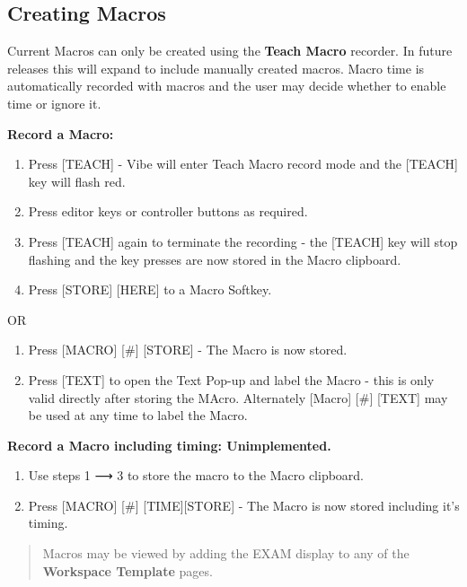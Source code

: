 \documentclass[
]{article}
\begin{document}
\hypertarget{creating-macros}{%
\subsection{Creating Macros}\label{creating-macros}}

Current Macros can only be created using the \textbf{Teach Macro} recorder. In future releases this will expand to include manually created macros. Macro time is automatically recorded with macros and the user may decide whether to enable time or ignore it.

\textbf{Record a Macro:}

\begin{enumerate}
\def\labelenumi{\arabic{enumi}.}
\item
  Press {[}TEACH{]} - Vibe will enter Teach Macro record mode and the {[}TEACH{]} key will flash red.
\item
  Press editor keys or controller buttons as required.
\item
  Press {[}TEACH{]} again to terminate the recording - the {[}TEACH{]} key will stop flashing and the key presses are now stored in the Macro clipboard.
\item
  Press {[}STORE{]} {[}HERE{]} to a Macro Softkey.
\end{enumerate}

OR

\begin{enumerate}
\def\labelenumi{\arabic{enumi}.}
\setcounter{enumi}{4}
\item
  Press {[}MACRO{]} {[}\#{]} {[}STORE{]} - The Macro is now stored.
\item
  Press {[}TEXT{]} to open the Text Pop-up and label the Macro - this is only valid directly after storing the MAcro. Alternately {[}Macro{]} {[}\#{]} {[}TEXT{]} may be used at any time to label the Macro.
\end{enumerate}

\textbf{{\textbf{Record a Macro including timing: Unimplemented}}.}

\begin{enumerate}
\def\labelenumi{\arabic{enumi}.}
\item
  {Use steps 1 ⟶ 3 to store the macro to the Macro clipboard.}
\item
  {Press {[}MACRO{]} {[}\#{]} {[}TIME{]}{[}STORE{]} - The Macro is now stored including it's timing.}
\end{enumerate}

\begin{quote}
Macros may be viewed by adding the EXAM display to any of the \textbf{Workspace Template} pages.
\end{quote}
\end{document}
